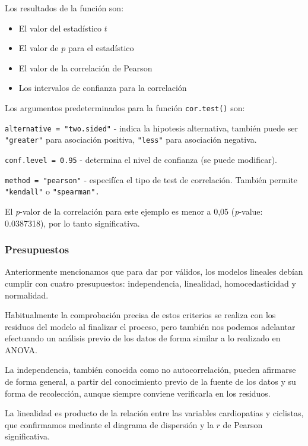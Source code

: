 \documentclass[
  letterpaper,
  DIV=11,
  numbers=noendperiod]{scrartcl}
\providecommand{\tightlist}{%
  \setlength{\itemsep}{0pt}\setlength{\parskip}{0pt}}\usepackage{longtable,booktabs,array}
\begin{document}
Los resultados de la función son:

\begin{itemize}
\tightlist
\item
  El valor del estadístico \(t\)
\item
  El valor de \(p\) para el estadístico
\item
  El valor de la correlación de Pearson
\item
  Los intervalos de confianza para la correlación
\end{itemize}

Los argumentos predeterminados para la función \texttt{cor.test()} son:

\texttt{alternative\ =\ "two.sided"} - indica la hipotesis alternativa,
también puede ser \texttt{"greater"} para asociación positiva,
\texttt{"less"} para asociación negativa.

\texttt{conf.level\ =\ 0.95} - determina el nivel de confianza (se puede
modificar).

\texttt{method\ =\ "pearson"} - especifíca el tipo de test de
correlación. También permite \texttt{"kendall"} o \texttt{"spearman".}

El \emph{p}-valor de la correlación para este ejemplo es menor a 0,05
(\emph{p}-value: 0.0387318), por lo tanto significativa.

\subsubsection{Presupuestos}\label{presupuestos}

Anteriormente mencionamos que para dar por válidos, los modelos lineales
debían cumplir con cuatro presupuestos: independencia, linealidad,
homocedasticidad y normalidad.

Habitualmente la comprobación precisa de estos criterios se realiza con
los residuos del modelo al finalizar el proceso, pero también nos
podemos adelantar efectuando un análisis previo de los datos de forma
similar a lo realizado en ANOVA.

La independencia, también conocida como no autocorrelación, pueden
afirmarse de forma general, a partir del conocimiento previo de la
fuente de los datos y su forma de recolección, aunque siempre conviene
verificarla en los residuos.

La linealidad es producto de la relación entre las variables
cardiopatias y ciclistas, que confirmamos mediante el diagrama de
dispersión y la \(r\) de Pearson significativa.
\end{document}
